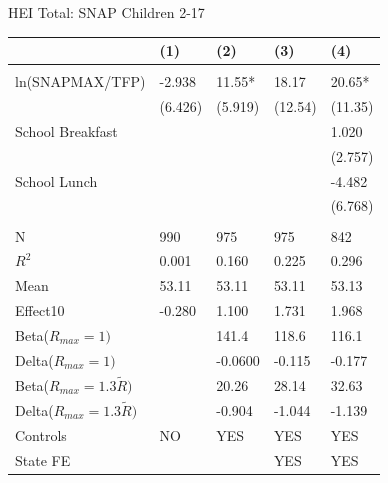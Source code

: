\documentclass{beamer}
\begin{document}
\begin{frame}
\begin{table}{HEI Total: SNAP Children 2-17}
\begin{adjustbox}{max width=\textwidth}
\begin{tabular}{lllll}
\toprule

 & (1) & (2) & (3) & (4) \\
\midrule
 \\
ln(SNAPMAX/TFP) & -2.938 & 11.55* & 18.17 & 20.65* \\
 & (6.426) & (5.919) & (12.54) & (11.35) \\
School Breakfast &  &  &  & 1.020 \\
 &  &  &  & (2.757) \\
School Lunch &  &  &  & -4.482 \\
 &  &  &  & (6.768) \\
 \\
N & 990 & 975 & 975 & 842 \\
$R^2$ & 0.001 & 0.160 & 0.225 & 0.296 \\
Mean & 53.11 & 53.11 & 53.11 & 53.13 \\
Effect10 & -0.280 & 1.100 & 1.731 & 1.968 \\
Beta($R_{max}=1)$ &  & 141.4 & 118.6 & 116.1 \\
Delta($R_{max}=1)$ &  & -0.0600 & -0.115 & -0.177 \\
Beta($R_{max}=1.3\tilde{R})$ &  & 20.26 & 28.14 & 32.63 \\
Delta($R_{max}=1.3\tilde{R})$ &  & -0.904 & -1.044 & -1.139 \\
Controls & NO & YES & YES & YES \\
State FE &  &  & YES & YES \\

\end{tabular}
\end{adjustbox}
\end{table}
\end{frame}
\end{document}

